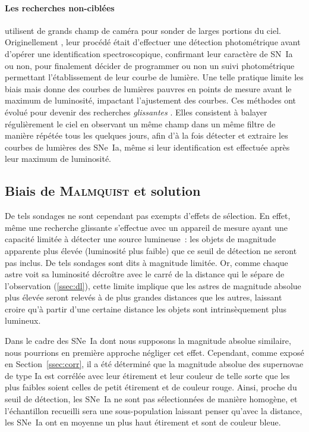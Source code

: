 \documentclass[../main/main.tex]{subfiles}
\begin{document}
\paragraph*{Les recherches non-ciblées} utilisent de grands champ de caméra pour
sonder de larges portions du ciel. Originellement
\citep[SCP,][]{perlmutter1999}, leur procédé était d'effectuer une
détection photométrique avant d'opérer une identification spectroscopique,
confirmant leur caractère de SN~Ia ou non, pour finalement décider de programmer
ou non un suivi photométrique permettant l'établissement de leur courbe de
lumière. Une telle pratique limite les biais mais donne des courbes de lumières
pauvres en points de mesure avant le maximum de luminosité, impactant
l'ajustement des courbes. Ces méthodes ont évolué pour devenir des recherches
\textit{glissantes} \citep{astier2006}. Elles consistent à balayer régulièrement
le ciel en observant un même champ dans un même filtre de manière répétée tous
les quelques jours, afin d'à la fois détecter et extraire les courbes de
lumières des SNe~Ia, même si leur identification est effectuée après leur
maximum de luminosité.

\subsection{Biais de \textsc{Malmquist} et solution}\label{ssec:malm}

De tels sondages ne sont cependant pas exempts d'effets de sélection. En effet,
même une recherche glissante s'effectue avec un appareil de mesure ayant une
capacité limitée à détecter une source lumineuse~: les objets de magnitude
apparente plus élevée (luminosité plus faible) que ce seuil de détection ne
seront pas inclus. De tels sondages sont dits à magnitude limitée. Or, comme
chaque astre voit sa luminosité décroître avec le carré de la distance qui le
sépare de l'observation (\ref{ssec:dl}), cette limite implique que les astres de
magnitude absolue plus élevée seront relevés à de plus grandes distances que les
autres, laissant croire qu'à partir d'une certaine distance les objets sont
intrinsèquement plus lumineux.

Dans le cadre des SNe~Ia dont nous supposons la magnitude absolue similaire,
nous pourrions en première approche négliger cet effet. Cependant, comme exposé
en Section~\ref{ssec:corr}, il a été déterminé que la magnitude absolue des
supernovae de type Ia est corrélée avec leur étirement et leur couleur de telle
sorte que les plus faibles soient celles de petit étirement et de couleur rouge.
Ainsi, proche du seuil de détection, les SNe~Ia ne sont pas sélectionnées de
manière homogène, et l'échantillon recueilli sera une sous-population laissant
penser qu'avec la distance, les SNe~Ia ont en moyenne un plus haut étirement et
sont de couleur bleue.
\end{document}
